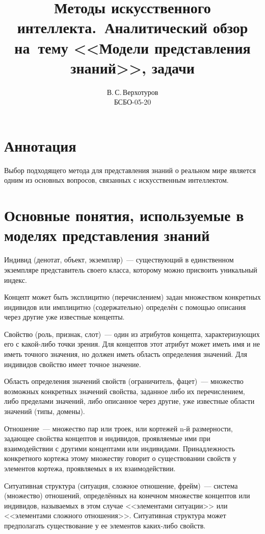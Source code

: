 \documentclass[14pt, a4paper, titlepage]{extarticle}
\title{Методы искусственного интеллекта.~Аналитический обзор на~тему <<Модели представления знаний>>, задачи}
\author{В.\,С.\,Верхотуров \\ БСБО-05-20}
\affil{РТУ МИРЭА}
\begin{document}
\maketitle

\section*{Аннотация}
Выбор подходящего метода для представления знаний о реальном мире является одним из основных вопросов, связанных с искусственным интеллектом.\cite{rashid2015semantic}

\section{Основные понятия, используемые в моделях представления знаний~\cite{белоус2010современные}}

Индивид (денотат, объект, экземпляр)~--- существующий в единственном экземпляре представитель своего класса, которому можно присвоить уникальный индекс.

Концепт может быть эксплицитно (перечислением) задан множеством конкретных индивидов или имплицитно (содержательно) определён с помощью описания через другие уже известные концепты.

Свойство (роль, признак, слот)~--- один из атрибутов концепта, характеризующих его с какой-либо точки зрения. Для концептов этот атрибут может иметь имя и не иметь точного значения, но должен иметь область определения значений. Для индивидов свойство имеет точное значение.

Область определения значений свойств (ограничитель, фацет)~--- множество возможных конкретных значений свойства, заданное либо их перечислением, либо пределами значений, либо описанное через другие, уже известные области значений (типы, домены).

Отношение~--- множество пар или троек, или кортежей n-й размерности, задающее свойства концептов и индивидов, проявляемые ими при взаимодействии с другими концептами или индивидами. Принадлежность конкретного кортежа этому множеству говорит о существовании свойств у элементов кортежа, проявляемых в их взаимодействии.

Ситуативная структура (ситуация, сложное отношение, фрейм)~--- система (множество) отношений, определённых на конечном множестве концептов или индивидов, называемых в этом случае <<элементами ситуации>> или <<элементами сложного отношения>>. Ситуативная структура может предполагать существование у ее элементов каких-либо свойств.
\end{document}
